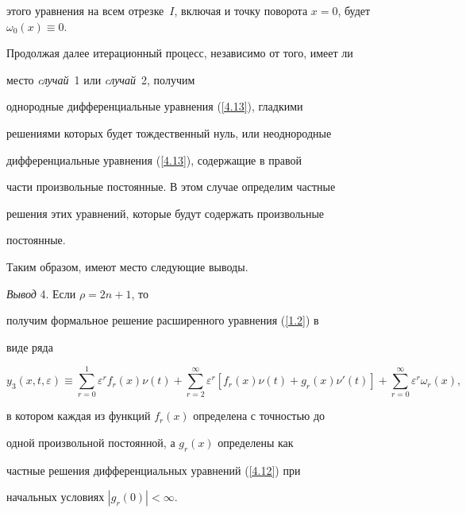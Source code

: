 этого уравнения на всем отрезке~$I$, включая и точку поворота $ x =


0$, будет $\omega_0 (x) \equiv 0$.





Продолжая далее итерационный процесс, независимо от того, имеет ли


место {\it cлучай}~1 или {\it cлучай}~2, получим


однородные дифференциальные уравнения (\ref{4.13}), гладкими


решениями которых будет тождественный нуль, или неоднородные


дифференциальные уравнения (\ref{4.13}), содержащие в правой


части произвольные постоянные. В этом случае определим частные


решения этих уравнений, которые будут содержать произвольные


постоянные.





Таким образом, имеют место следующие выводы.


\medskip





{\it Вывод} 4. Если $\rho = 2n + 1$, то


получим формальное решение расширенного уравнения (\ref{1.2}) в


виде ряда


\begin{equation} \label{4.14}


y_{3} (x, t, \varepsilon) \equiv \sum_{r = 0}^{1} 


\varepsilon^r f_{ r}(x) \nu (t) + \sum_{r =


2}^{\infty} \varepsilon^r [f_{ r}(x) \nu (t) + g_{ r}(x) \nu


 ' (t)] + \sum_{r =0}^{\infty} \varepsilon^r \omega_r(x),


\end{equation}


в котором каждая из функций $f_{r} (x)$ определена с точностью до


одной произвольной постоянной, а $g_{r} (x)$ определены как


частные решения дифференциальных уравнений (\ref{4.12}) при


начальных условиях $|g_{r} (0)|<\infty$.


\medskip





